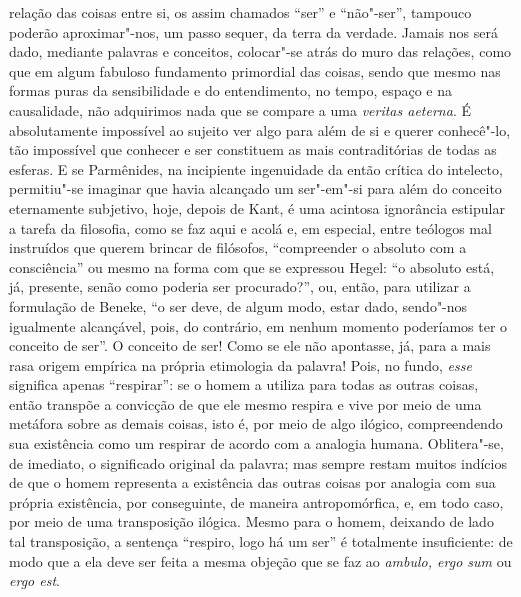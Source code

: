 relação das coisas entre si, os assim chamados ``ser'' e ``não"-ser'',
tampouco poderão aproximar"-nos, um passo sequer, da terra da verdade.
Jamais nos será dado, mediante palavras e conceitos, colocar"-se atrás
do muro das relações, como que em algum fabuloso fundamento primordial
das coisas, sendo que mesmo nas formas puras da sensibilidade e do
entendimento, no tempo, espaço e na causalidade, não adquirimos nada
que se compare a uma \textit{veritas aeterna}. É absolutamente
impossível ao sujeito ver algo para além de si e querer conhecê"-lo, tão
impossível que conhecer e ser constituem as mais contraditórias de
todas as esferas. E se Parmênides, na incipiente ingenuidade da então
crítica do intelecto, permitiu"-se imaginar que havia alcançado um
ser"-em"-si para além do conceito eternamente subjetivo, hoje, depois de
Kant, é uma acintosa ignorância estipular a tarefa da filosofia, como
se faz aqui e acolá e, em especial, entre teólogos mal instruídos que
querem brincar de filósofos, ``compreender o absoluto com a
consciência'' ou mesmo na forma com que se expressou Hegel: ``o
absoluto está, já, presente, senão como poderia ser procurado?'', ou,
então, para utilizar a formulação de Beneke, ``o ser deve, de algum
modo, estar dado, sendo"-nos igualmente alcançável, pois, do contrário,
em nenhum momento poderíamos ter o conceito de ser''. O conceito de ser!
Como se ele não apontasse, já, para a mais rasa origem empírica na
própria etimologia da palavra! Pois, no fundo, \textit{esse} significa
apenas ``respirar'': se o homem a utiliza para todas as outras coisas,
então transpõe a convicção de que ele mesmo respira e vive por meio de
uma metáfora sobre as demais coisas, isto é, por meio de algo ilógico,
compreendendo sua existência como um respirar de acordo com a analogia
humana. Oblitera"-se, de imediato, o significado original da palavra;
mas sempre restam muitos indícios de que o homem representa a
existência das outras coisas por analogia com sua própria existência,
por conseguinte, de maneira antropomórfica, e, em todo caso, por meio
de uma transposição ilógica. Mesmo para o homem, deixando de lado
tal transposição, a sentença ``respiro, logo há um ser'' é totalmente
insuficiente: de modo que a ela deve ser feita a mesma objeção que se
faz ao \textit{ambulo, ergo sum} ou \textit{ergo est}.

\sectionitem

